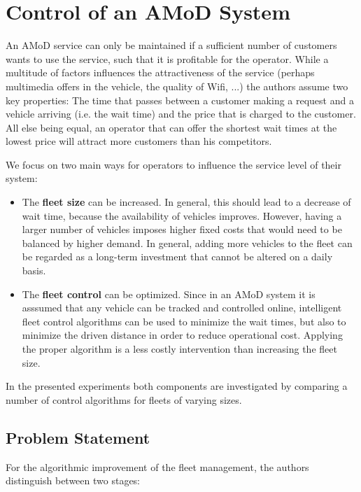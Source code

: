 \section{Control of an AMoD System}
\label{sec:background}

An AMoD service can only be maintained if a sufficient number of customers
wants to use the service, such that it is profitable for the operator. While a multitude
of factors influences the attractiveness of the service (perhaps
multimedia offers in the vehicle, the quality of Wifi, ...) the authors assume
two key properties: The time that passes between a customer making a request
and a vehicle arriving (i.e. the wait time) and the price that is charged to
the customer. All else being equal, an operator that can offer the shortest wait
times at the lowest price will attract more customers than his competitors.

We focus on two main ways for operators to influence the service level of their system:

\begin{itemize}
\item The \textbf{fleet size} can be increased. In general, this should lead to
a decrease of wait time, because the availability of vehicles improves. However,
having a larger number of vehicles imposes higher fixed costs that would need to be
balanced by higher demand. In general, adding more vehicles to the fleet can be
regarded as a long-term investment that cannot be altered on a daily basis.
\item The \textbf{fleet control} can be optimized. Since in an AMoD system it is
asssumed that any vehicle can be tracked and controlled online, intelligent fleet
control algorithms can be used to minimize the wait times, but also to minimize the
driven distance in order to reduce operational cost. Applying the proper algorithm is a
less costly intervention than increasing the fleet size.
\end{itemize}

In the presented experiments both components are investigated by comparing a number
of control algorithms for fleets of varying sizes.

\subsection{Problem Statement}

For the algorithmic improvement of the fleet management, the authors distinguish
between two stages:

